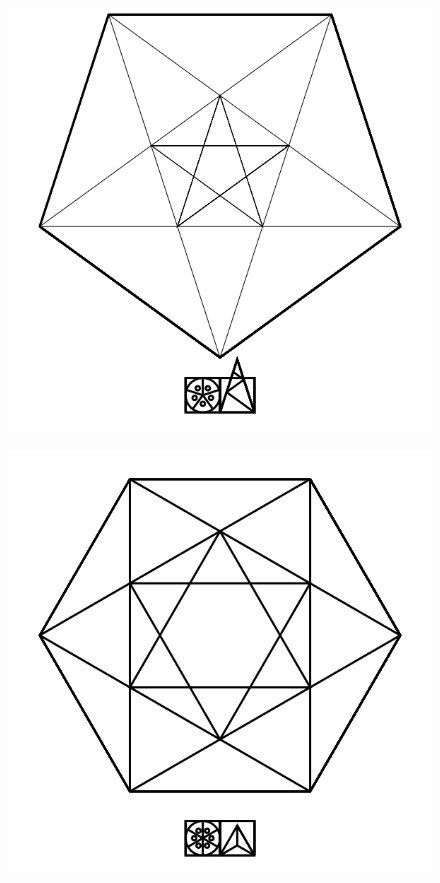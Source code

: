 \documentclass[17pt]{extreport}
\begin{document}
	\begin{figure}
		\centering
		\includegraphics[width=6.25in]{imageserver/uploadimages/image4.png}
	\end{figure}	
	\begin{figure}
		\centering
		\includegraphics[width=6.25in]{imageserver/uploadimages/image5.png}
	\end{figure}
	
\end{document}
